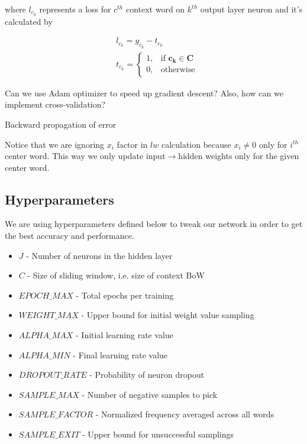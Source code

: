\documentclass{article}
\newcommand{\SetAlgoStyle}{
	\SetAlgoNoLine
	\SetAlgoNoEnd
	\DontPrintSemicolon
}
\begin{document}
where $l_{c_k}$ represents a loss for $c^{th}$ context word on $k^{th}$ output layer
neuron and it's calculated by

\begin{align}
	&l_{c_k} = y_{c_k} - t_{c_k} \\
	&t_{c_k} =
	\begin{cases}
		1, &\text{if } \boldsymbol{c_k} \in \boldsymbol{C} \\
		0, &\text{otherwise}
	\end{cases}
\end{align}

Can we use Adam optimizer to speed up gradient descent?
Also, how can we implement cross-validation?

\begin{algorithm}[H]
	\caption{Backward propagation of error}
	\SetAlgoStyle
\end{algorithm}

Notice that we are ignoring $x_i$ factor in $lw$ calculation because $x_i
\neq 0$ only for $i^{th}$ center word. This way we only update
input$\rightarrow$hidden weights only for the given center word.

\subsection{Hyperparameters}

We are using hyperparameters defined below to tweak our network in order to get the best accuracy and performance.

\begin{itemize}
	\item $J$ - Number of neurons in the hidden layer
	\item $C$ - Size of sliding window, i.e. size of context BoW
	\item $EPOCH\_MAX$ - Total epochs per training
	\item $WEIGHT\_MAX$ - Upper bound for initial weight value sampling
	\item $ALPHA\_MAX$ - Initial learning rate value
	\item $ALPHA\_MIN$ - Final learning rate value
	\item $DROPOUT\_RATE$ - Probability of neuron dropout
	\item $SAMPLE\_MAX$ - Number of negative samples to pick
	\item $SAMPLE\_FACTOR$ - Normalized frequency averaged across all words
	\item $SAMPLE\_EXIT$ - Upper bound for unsuccessful samplings
\end{itemize}
\end{document}
